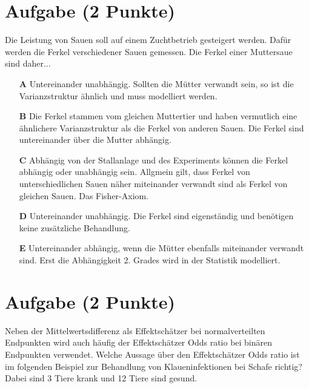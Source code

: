 \documentclass[a4paper, 9pt]{scrartcl}\usepackage[]{graphicx}\usepackage[]{xcolor}
\begin{document}
\section{Aufgabe \hfill (2 Punkte)}



Die Leistung von Sauen soll auf einem Zuchtbetrieb gesteigert werden. Dafür werden die Ferkel verschiedener Sauen gemessen. Die Ferkel einer Muttersaue sind daher...



\begin{enumerate}
\item [\textbf{A} \msquare] Untereinander unabhängig. Sollten die Mütter verwandt sein, so ist die Varianzstruktur ähnlich und muss modelliert werden.
\item [\textbf{B} \msquare] Die Ferkel stammen vom gleichen Muttertier und haben vermutlich eine ähnlichere Varianzstruktur als die Ferkel von anderen Sauen. Die Ferkel sind untereinander über die Mutter abhängig.
\item [\textbf{C} \msquare] Abhängig von der Stallanlage und des Experiments können die Ferkel abhängig oder unabhängig sein. Allgmein gilt, dass Ferkel von unterschiedlichen Sauen näher miteinander verwandt sind als Ferkel von gleichen Sauen. Das Fisher-Axiom.
\item [\textbf{D} \msquare] Untereinander unabhängig. Die Ferkel sind eigenständig und benötigen keine zusätzliche Behandlung.
\item [\textbf{E} \msquare] Untereinander abhängig, wenn die Mütter ebenfalls miteinander verwandt sind. Erst die Abhängigkeit 2. Grades wird in der Statistik modelliert.
\end{enumerate}

\section{Aufgabe \hfill (2 Punkte)}



Neben der Mittelwertsdifferenz als Effektschätzer bei normalverteilten Endpunkten wird auch häufig der Effektschätzer Odds ratio bei binären Endpunkten verwendet. Welche Aussage über den Effektschätzer Odds ratio ist im folgenden Beispiel zur Behandlung von Klaueninfektionen bei Schafe richtig? Dabei sind 3 Tiere krank und 12 Tiere sind gesund.
\end{document}
